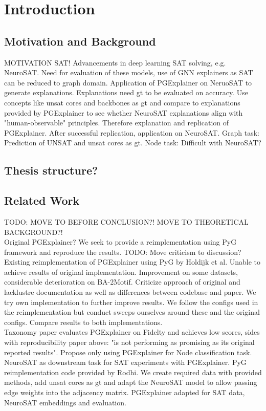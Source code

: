 \chapter{Introduction}
\label{ch:Introduction}

\section{Motivation and Background}
MOTIVATION SAT! Advancements in deep learning SAT solving, e.g. NeuroSAT. Need for evaluation of these models, use of GNN explainers as SAT can be reduced to graph domain. Application of PGExplainer on NeruoSAT to generate explanations. Explanations need gt to be evaluated on accuracy. Use concepts like unsat cores and backbones as gt and compare to explanations provided by PGExplainer to see whether NeuroSAT explanations align with "human-observable" principles.
Therefore explanation and replication of PGExplainer. After successful replication, application on NeuroSAT. \bigskip
Graph task: Prediction of UNSAT and unsat cores as gt. Node task: Difficult with NeuroSAT?

\section{Thesis structure?}

\section{Related Work}
TODO: MOVE TO BEFORE CONCLUSION?! MOVE TO THEORETICAL BACKGROUND?! \\
Original PGExplainer? We seek to provide a reimplementation using PyG framework and reproduce the results. \bigskip
TODO: Move criticism to discussion? \bigskip
Existing reimplementation of PGExplainer using PyG by Holdijk et al. Unable to achieve results of original implementation. Improvement on some datasets, considerable deterioration on BA-2Motif. Criticize approach of original and lacklustre documentation as well as differences between codebase and paper. We try own implementation to further improve results. We follow the configs used in the reimplementation but conduct sweeps ourselves around these and the original configs. Compare results to both implementations. \\
Taxonomy paper evaluates PGExplainer on Fidelty and achieves low scores, sides with reproducibility paper above: "is not performing as promising as its original
reported results". Propose only using PGExplainer for Node classification task.\bigskip
NeuroSAT as downstream task for SAT experiments with PGExplainer. PyG reimplementation code provided by Rodhi. We create required data with provided methods, add unsat cores as gt and adapt the NeuroSAT model to allow passing edge weights into the adjacency matrix. PGExplainer adapted for SAT data, NeuroSAT embeddings and evaluation.